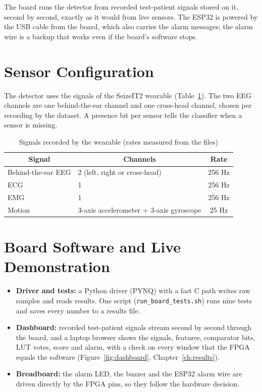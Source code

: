 The board runs the detector from recorded test-patient signals stored on it, second by second, exactly as it would
from live sensors. The ESP32 is powered by the USB cable from the board, which also carries the alarm messages; the
alarm wire is a backup that works even if the board's software stops.

\section{Sensor Configuration}

The detector uses the signals of the SeizeIT2 wearable (Table~\ref{tab:modalities}). The two EEG channels are one
behind-the-ear channel and one cross-head channel, chosen per recording by the dataset. A presence bit per sensor
tells the classifier when a sensor is missing.

\begin{table}[H]
\centering\small
\caption{Signals recorded by the wearable (rates measured from the files)}\label{tab:modalities}
\begin{tabular}{|l|l|c|}
\hline
\multicolumn{1}{|c|}{\textbf{Signal}} & \multicolumn{1}{c|}{\textbf{Channels}} & \textbf{Rate}\\
\hline
Behind-the-ear EEG & 2 (left, right or cross-head) & 256 Hz\\
\hline
ECG & 1 & 256 Hz\\
\hline
EMG & 1 & 256 Hz\\
\hline
Motion & 3-axis accelerometer + 3-axis gyroscope & 25 Hz\\
\hline
\end{tabular}
\end{table}

\section{Board Software and Live Demonstration}

\begin{itemize}
\item \textbf{Driver and tests:} a Python driver (PYNQ) with a fast C path writes raw samples and reads results. One
  script (\texttt{run\_board\_tests.sh}) runs nine tests and saves every number to a results file.
\item \textbf{Dashboard:} recorded test-patient signals stream second by second through the board, and a laptop
  browser shows the signals, features, comparator bits, LUT votes, score and alarm, with a check on every window that
  the FPGA equals the software (Figure~\ref{fig:dashboard}, Chapter~\ref{ch:results}).
\item \textbf{Breadboard:} the alarm LED, the buzzer and the ESP32 alarm wire are driven directly by the FPGA pins,
  so they follow the hardware decision.
\end{itemize}


